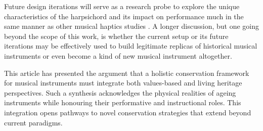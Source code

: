 Future design iterations will serve as a research probe to explore the unique characteristics of the harpsichord and its impact on performance much in the same manner as other musical haptics studies \cite{charalampos-saitis_musical_2018}. A longer discussion, but one going beyond the scope of this work, is whether the current setup or its future iterations may be effectively used to build legitimate replicas of historical musical instruments or even become a kind of new musical instrument altogether.

This article has presented the argument that a holistic conservation framework for musical instruments must integrate both values-based and living heritage perspectives. Such a synthesis acknowledges the physical realities of ageing instruments while honouring their performative and instructional roles. This integration opens pathways to novel conservation strategies that extend beyond current paradigms.
